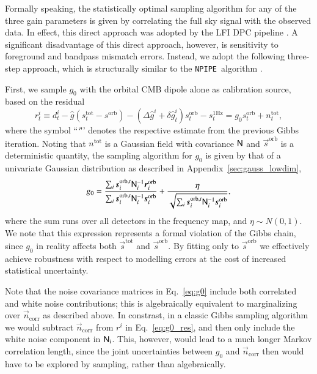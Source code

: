 \documentclass[onecolumn]{aa}
\newcommand{\n}[0]{\vec{n}}
\newcommand{\s}[0]{\vec{s}}
\newcommand{\N}[0]{\tens{N}}
\renewcommand{\r}[0]{\vec{r}}
\newcommand{\npipe}[0]{\texttt{NPIPE}}
\begin{document}
Formally speaking, the statistically optimal sampling algorithm for
any of the three gain parameters is given by correlating the full sky
signal with the observed data. In effect, this direct approach was
adopted by the LFI DPC pipeline \citep{planck2016-l02}. A significant
disadvantage of this direct approach, however, is sensitivity to
foreground and bandpass mismatch errors. Instead, we adopt the
following three-step approach, which is structurally similar to the
\npipe\ algorithm \citep{planck2020-LVII}.

First, we sample $g_0$ with the orbital CMB dipole alone as
calibration source, based on the residual
\begin{equation}
  r^i_t \equiv d^i_{t} - \hat{g} (s^{\mathrm{tot}}_{t} -
  s^{\mathrm{orb}}) - (\Delta \hat{g}^i + \delta \hat{g}_t^i) s^{\mathrm{orb}}_{t} - s^{\mathrm{1Hz}}_t
 =  g_0 s^{\mathrm{orb}}_{t} + n^{\mathrm{tot}}_{t},
\end{equation}
where the symbol ``\char`\^'' denotes the respective estimate from the
previous Gibbs iteration. Noting that $n^{\mathrm{tot}}$ is a Gaussian
field with covariance $\N$ and $\s^{\mathrm{orb}}$ is a deterministic
quantity, the sampling algorithm for $g_0$ is given by that of a
univariate Gaussian distribution as described in
Appendix~\ref{sec:gauss_lowdim},
\begin{equation}
  g_0 =
  \frac{\sum_i\s_i^{\mathrm{orb},t}\N_i^{-1}\r_i^{\mathrm{orb}}}{\sum_i\s_i^{\mathrm{orb},t}\N_i^{-1}\s_i^{\mathrm{orb}}}
  +
  \frac{\eta}{\sqrt{\sum_i\s_i^{\mathrm{orb},t}\N_i^{-1}\s_i^{\mathrm{orb}}}},
  \label{eq:g0}
\end{equation}
where the sum runs over all detectors in the frequency map, and $\eta
\sim N(0,1)$.  We note that this expression represents a formal
violation of the Gibbs chain, since $g_0$ in reality affects both
$\s^{\mathrm{tot}}$ and $\s^{\mathrm{orb}}$. By fitting only to
$\s^{\mathrm{orb}}$ we effectively achieve robustness with respect to
modelling errors at the cost of increased statistical
uncertainty.

Note that the noise covariance matrices in Eq.~\eqref{eq:g0} include
both correlated and white noise contributions; this is algebraically
equivalent to marginalizing over $\n_{\mathrm{corr}}$ as described
above. In constrast, in a classic Gibbs sampling algorithm we would
subtract $\n_{\mathrm{corr}}$ from $r^i$ in Eq.~\eqref{eq:g0_res}, and
then only include the white noise component in $\N_i$. This, however,
would lead to a much longer Markov correlation length, since the joint
uncertainties between $g_0$ and $\n_{\mathrm{corr}}$ then would have
to be explored by sampling, rather than algebraically.
\end{document}

